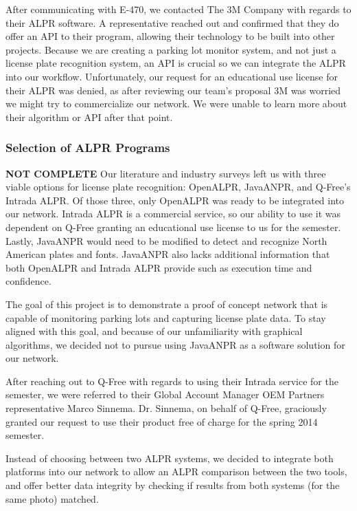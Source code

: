 \documentclass[11pt, oneside, fullpage, doublespace]{article}
\begin{document}
After communicating with E-470, we contacted The 3M Company with regards to their ALPR software. A representative reached out and confirmed that they do offer an API to their program, allowing their technology to be built into other projects. Because we are creating a parking lot monitor system, and not just a license plate recognition system, an API is crucial so we can integrate the ALPR into our workflow. Unfortunately, our request for an educational use license for their ALPR was denied, as after reviewing our team's proposal 3M was worried we might try to commercialize our network. We were unable to learn more about their algorithm or API after that point.

\subsubsection{Selection of ALPR Programs}
{\color{red}\textbf{NOT COMPLETE}}
Our literature and industry surveys left us with three viable options for license plate recognition: OpenALPR, JavaANPR, and Q-Free's Intrada ALPR. Of those three, only OpenALPR was ready to be integrated into our network. Intrada ALPR is a commercial service, so our ability to use it was dependent on Q-Free granting an educational use license to us for the semester. Lastly, JavaANPR would need to be modified to detect and recognize North American plates and fonts. JavaANPR also lacks additional information that both OpenALPR and Intrada ALPR provide such as execution time and confidence.

The goal of this project is to demonstrate a proof of concept network that is capable of monitoring parking lots and capturing license plate data. To stay aligned with this goal, and because of our unfamiliarity with graphical algorithms, we decided not to pursue using JavaANPR as a software solution for our network.

After reaching out to Q-Free with regards to using their Intrada service for the semester, we were referred to their Global Account Manager OEM Partners representative Marco Sinnema. Dr. Sinnema, on behalf of Q-Free, graciously granted our request to use their product free of charge for the spring 2014 semester.

Instead of choosing between two ALPR systems, we decided to integrate both platforms into our network to allow an ALPR comparison between the two tools, and offer better data integrity by checking if results from both systems (for the same photo) matched.
\end{document}
